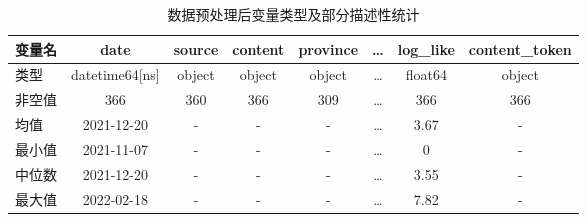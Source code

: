\begin{table}[!ht] \centering
    \begin{tabularx}{\linewidth}{X c c c c c c c}
        \toprule
        变量名 & date & source & content & province & \dots & log\_like & content\_token \\
        \midrule
        类型 & datetime64[ns] & object & object & object & \dots & float64 & object \\
        非空值 & 366 & 360 & 366 & 309 & \dots & 366 & 366 \\
        均值 & 2021-12-20 & - & - & - & \dots & 3.67 & - \\
        最小值 & 2021-11-07 & - & - & - & \dots & 0 & -\\
        中位数 & 2021-12-20 & - & - & - & \dots & 3.55 & -\\
        最大值 & 2022-02-18 & - & - & - & \dots & 7.82 & -\\
        \bottomrule
    \end{tabularx}
    \caption{数据预处理后变量类型及部分描述性统计}
    \label{tab:datasetPreprocessedVariable}
\end{table}